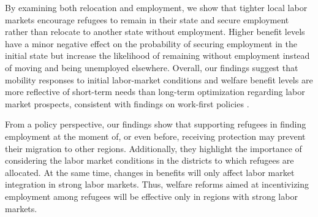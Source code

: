 By examining both relocation and employment, we show that tighter local labor markets encourage refugees to remain in their state and secure employment rather than relocate to another state without employment. Higher benefit levels have a minor negative effect on the probability of securing employment in the initial state but increase the likelihood of remaining without employment instead of moving and being unemployed elsewhere. Overall, our findings suggest that mobility responses to initial labor-market conditions and welfare benefit levels are more reflective of short-term needs than long-term optimization regarding labor market prospects, consistent with findings on work-first policies \citep{arendt_labor_2022, arendt_trade-offs_2023}.

From a policy perspective, our findings show that supporting refugees in finding employment at the moment of, or even before, receiving protection may prevent their migration to other regions. Additionally, they highlight the importance of considering the labor market conditions in the districts to which refugees are allocated. At the same time, changes in benefits will only affect labor market integration in strong labor markets. Thus, welfare reforms aimed at incentivizing employment among refugees will be effective only in regions with strong labor markets.

